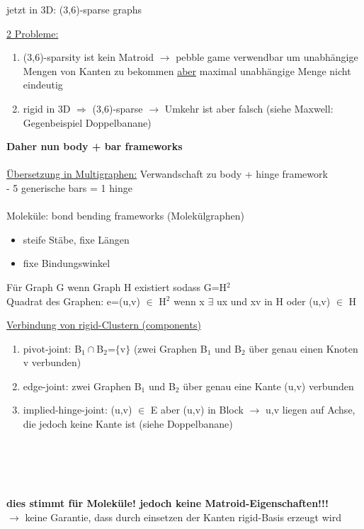 \documentclass[12pt,a4paper]{article}
\begin{document}
jetzt in 3D: (3,6)-sparse graphs\\
\parbox{\linewidth}{
\underline{2 Probleme:}
\begin{enumerate}
	\item (3,6)-sparsity ist kein Matroid $\rightarrow$ pebble game verwendbar um unabhängige Mengen von Kanten zu bekommen \underline{aber} maximal unabhängige Menge nicht eindeutig
	\item rigid in 3D $\Rightarrow$ (3,6)-sparse $\rightarrow$ Umkehr ist aber falsch (siehe Maxwell: Gegenbeispiel Doppelbanane)
\end{enumerate}
}
\textbf{Daher nun body + bar frameworks}
\\\\
\underline{Übersetzung in Multigraphen:} Verwandschaft zu body +  hinge framework\\
 - 5 generische bars = 1 hinge\\
\\
Moleküle: bond bending frameworks (Molekülgraphen)
\begin{itemize}
	\item steife Stäbe, fixe Längen
	\item fixe Bindungswinkel
\end{itemize}

Für Graph G wenn Graph H existiert sodass G=H$^2$\\
Quadrat des Graphen: e=(u,v) $\in$ H$^2$ wenn x $\exists$ ux und xv in H oder (u,v) $\in$ H

\underline{Verbindung von rigid-Clustern (components)}
\begin{enumerate}
	\item pivot-joint: B$_1\cap$B$_2$=$\{$v$\}$ (zwei Graphen B$_1$ und B$_2$ über genau einen Knoten v verbunden)
	\item edge-joint: zwei Graphen B$_1$ und B$_2$ über genau eine Kante (u,v) verbunden
	\item implied-hinge-joint: (u,v) $\in$ E aber (u,v) in Block $\rightarrow$ u,v liegen auf Achse, die jedoch keine Kante ist (siehe Doppelbanane)
\end{enumerate}

\\\\
\\\\
\textbf{dies stimmt für Moleküle! jedoch keine Matroid-Eigenschaften!!!}\\
$\rightarrow$ keine Garantie, dass durch einsetzen der Kanten rigid-Basis erzeugt wird
\newpage
\end{document}

